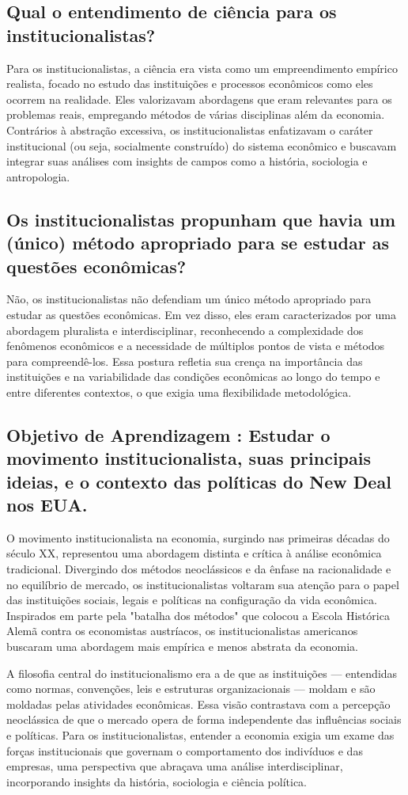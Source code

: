\documentclass[12pt]{article}
\begin{document}
\subsection{\textbf{Qual o entendimento de ciência para os institucionalistas?}}
Para os institucionalistas, a ciência era vista como um empreendimento empírico realista, focado no estudo das instituições e processos econômicos como eles ocorrem na realidade. Eles valorizavam abordagens que eram relevantes para os problemas reais, empregando métodos de várias disciplinas além da economia. Contrários à abstração excessiva, os institucionalistas enfatizavam o caráter institucional (ou seja, socialmente construído) do sistema econômico e buscavam integrar suas análises com insights de campos como a história, sociologia e antropologia.
\subsection{\textbf{Os institucionalistas propunham que havia um (único) método apropriado para se estudar as questões econômicas?}}
Não, os institucionalistas não defendiam um único método apropriado para estudar as questões econômicas. Em vez disso, eles eram caracterizados por uma abordagem pluralista e interdisciplinar, reconhecendo a complexidade dos fenômenos econômicos e a necessidade de múltiplos pontos de vista e métodos para compreendê-los. Essa postura refletia sua crença na importância das instituições e na variabilidade das condições econômicas ao longo do tempo e entre diferentes contextos, o que exigia uma flexibilidade metodológica.
\subsection{\textbf{Objetivo de Aprendizagem : Estudar o movimento institucionalista, suas principais ideias, e o contexto das políticas do New Deal nos EUA.}}
O movimento institucionalista na economia, surgindo nas primeiras décadas do século XX, representou uma abordagem distinta e crítica à análise econômica tradicional. Divergindo dos métodos neoclássicos e da ênfase na racionalidade e no equilíbrio de mercado, os institucionalistas voltaram sua atenção para o papel das instituições sociais, legais e políticas na configuração da vida econômica. Inspirados em parte pela "batalha dos métodos" que colocou a Escola Histórica Alemã contra os economistas austríacos, os institucionalistas americanos buscaram uma abordagem mais empírica e menos abstrata da economia.

A filosofia central do institucionalismo era a de que as instituições — entendidas como normas, convenções, leis e estruturas organizacionais — moldam e são moldadas pelas atividades econômicas. Essa visão contrastava com a percepção neoclássica de que o mercado opera de forma independente das influências sociais e políticas. Para os institucionalistas, entender a economia exigia um exame das forças institucionais que governam o comportamento dos indivíduos e das empresas, uma perspectiva que abraçava uma análise interdisciplinar, incorporando insights da história, sociologia e ciência política.
\end{document}
